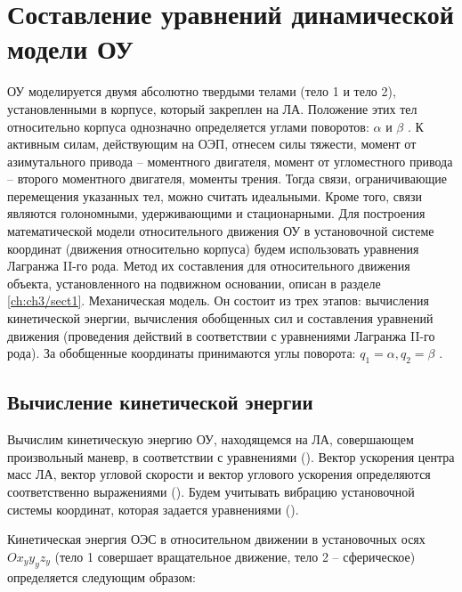 
\section{Составление уравнений динамической модели ОУ} \label{ch:ch3/sect5}

ОУ моделируется двумя абсолютно твердыми телами (тело 1 и тело 2), установленными в корпусе, который закреплен на ЛА. Положение этих тел относительно корпуса однозначно определяется углами поворотов: \( \alpha \) и \( \beta \) . К активным силам, действующим на ОЭП, отнесем силы тяжести, момент от азимутального привода – моментного двигателя, момент от угломестного привода – второго моментного двигателя, моменты трения. Тогда связи, ограничивающие перемещения указанных тел, можно считать идеальными. Кроме того, связи являются голономными, удерживающими и стационарными. Для построения математической модели относительного движения ОУ в установочной системе координат (движения относительно корпуса) будем использовать уравнения Лагранжа II-го рода. Метод их составления для относительного движения объекта, установленного на подвижном основании, описан в разделе \ref{ch:ch3/sect1}. Механическая модель. Он состоит из трех этапов: вычисления кинетической энергии, вычисления обобщенных сил и составления уравнений движения (проведения действий в соответствии с уравнениями Лагранжа II-го рода). За обобщенные координаты принимаются углы поворота: \( q_{1}= \alpha, q_{2}= \beta \) . 





\subsection{Вычисление кинетической энергии} \label{sec:ch3/sec6}

Вычислим кинетическую энергию ОУ, находящемся на ЛА, совершающем произвольный маневр, в соответствии с уравнениями (). Вектор ускорения центра масс ЛА, вектор угловой скорости и вектор углового ускорения определяются соответственно выражениями (). Будем учитывать вибрацию установочной системы координат, которая задается уравнениями ().

Кинетическая энергия ОЭС в относительном движении в установочных осях \( Ox_{y}y_{y}z_{y} \) (тело 1 совершает вращательное движение, тело 2 – сферическое) определяется следующим образом: 

